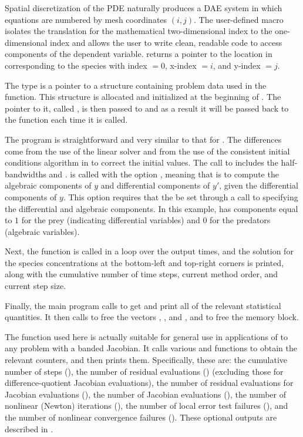 Spatial discretization of the PDE naturally produces a DAE system in
which equations are numbered by mesh coordinates $(i,j)$. The
user-defined macro  isolates the translation for the
mathematical two-dimensional index to the one-dimensional
 index and allows the user to write clean, readable code
to access components of the dependent variable. 
returns a pointer to the location in  corresponding to the species
with index  $= 0$, x-index  $= i$, and y-index  $= j$.

The type  is a pointer to a structure containing problem
data used in the  function.  This structure is
allocated and initialized at the beginning of . The pointer
to it, called , is then passed to  and as a result 
it will be passed back to the  function each time it is called.

The  program is straightforward and very similar to that for .
The differences come from the use of the {\idaband} linear solver and from the
use of the consistent initial conditions algorithm in {\ida} to correct the initial
values. The call to  includes the half-bandwidths  and .
 is called with the option , meaning
that {\ida} is to compute the algebraic components of $y$ and differential  
components of $y'$, given the differential components of $y$.  
This option requires that the   be set through a call to 
 specifying the differential and algebraic components. In this example,
 has components equal to $1$ for the prey (indicating differential 
variables) and $0$ for the predators (algebraic variables).

Next, the  function is called in a loop over the output times,
and the solution for the species concentrations at the bottom-left and
top-right corners is printed, along with the cumulative number of time
steps, current method order, and current step size.

Finally, the main program calls  to get and print
all of the relevant statistical quantities.  It then calls 
to free the vectors , , and , and  to free the 
{\ida} memory block.

The function  used here is actually suitable for
general use in applications of {\ida} to any problem with a banded
Jacobian.  It calls various  and 
functions to obtain the relevant counters, and then prints them.
Specifically, these are: the cumulative number of steps (), 
the number of residual evaluations () (excluding those for
difference-quotient Jacobian evaluations),
the number of residual evaluations for Jacobian evaluations (),
the number of Jacobian evaluations (),
the number of nonlinear (Newton) iterations (),
the number of local error test failures (),
and the number of nonlinear convergence failures ().
These optional outputs are described in .

